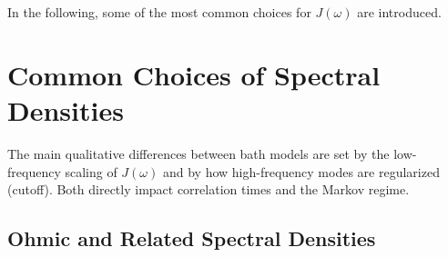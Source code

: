 In the following, some of the most common choices for $J(\omega)$ are introduced.

\section{Common Choices of Spectral Densities}
\label{sec:oqs_common_choices_spectral_densities}
The main qualitative differences between bath models are set by the low-frequency scaling of $J(\omega)$ and by how high-frequency modes are regularized (cutoff). Both directly impact correlation times and the Markov regime.


\subsection{Ohmic and Related Spectral Densities}
\label{subsec:oqs_ohmic_spectral_density}

